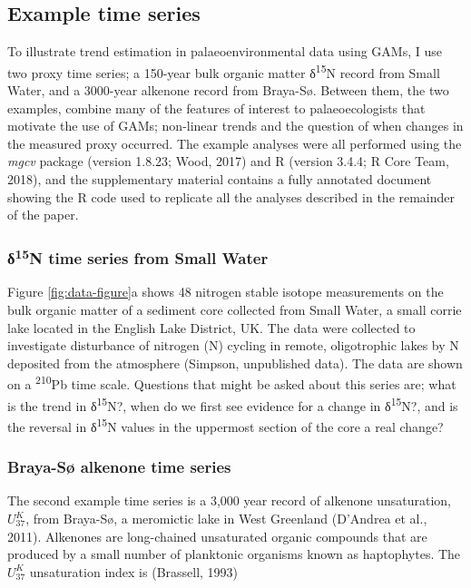 \documentclass[12pt,]{article}
\newcommand{\uk}{\ensuremath{\mathit{U}^{\mathit{K}}_{\mathup{37}}}}
\begin{document}
\subsection{Example time series}\label{example-time-series}

To illustrate trend estimation in palaeoenvironmental data using GAMs, I
use two proxy time series; a 150-year bulk organic matter
δ\textsuperscript{15}N record from Small Water, and a 3000-year alkenone
record from Braya-Sø. Between them, the two examples, combine many of
the features of interest to palaeoecologists that motivate the use of
GAMs; non-linear trends and the question of when changes in the measured
proxy occurred. The example analyses were all performed using the
\emph{mgcv} package (version 1.8.23; Wood, 2017) and R (version 3.4.4; R
Core Team, 2018), and the supplementary material contains a fully
annotated document showing the R code used to replicate all the analyses
described in the remainder of the paper.

\subsubsection{\texorpdfstring{δ\textsuperscript{15}N time series from
Small
Water}{δ15N time series from Small Water}}\label{15n-time-series-from-small-water}

Figure \ref{fig:data-figure}a shows 48 nitrogen stable isotope
measurements on the bulk organic matter of a sediment core collected
from Small Water, a small corrie lake located in the English Lake
District, UK. The data were collected to investigate disturbance of
nitrogen (N) cycling in remote, oligotrophic lakes by N deposited from
the atmosphere (Simpson, unpublished data). The data are shown on a
\textsuperscript{210}Pb time scale. Questions that might be asked about
this series are; what is the trend in δ\textsuperscript{15}N?, when do
we first see evidence for a change in δ\textsuperscript{15}N?, and is
the reversal in δ\textsuperscript{15}N values in the uppermost section
of the core a real change?

\subsubsection{Braya-Sø alkenone time
series}\label{braya-s-alkenone-time-series}

The second example time series is a 3,000 year record of alkenone
unsaturation, \uk, from Braya-Sø, a meromictic lake in West Greenland
(D'Andrea et al., 2011). Alkenones are long-chained unsaturated organic
compounds that are produced by a small number of planktonic organisms
known as haptophytes. The \uk{} unsaturation index is (Brassell, 1993)
\end{document}
